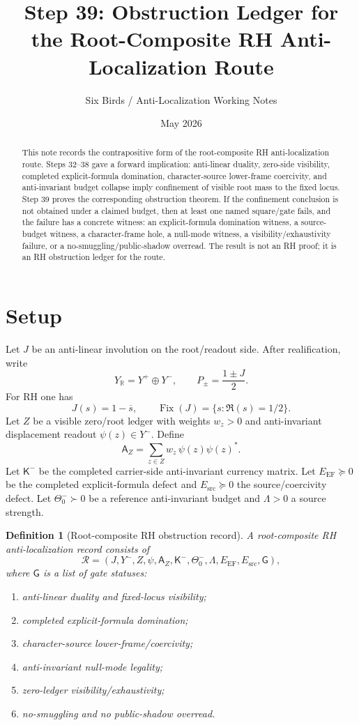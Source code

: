 \documentclass[11pt]{article}
\title{Step 39: Obstruction Ledger for the Root-Composite RH Anti-Localization Route}
\author{Six Birds / Anti-Localization Working Notes}
\date{May 2026}
\newtheorem{definition}{Definition}
\newcommand{\K}{\mathsf K}
\newcommand{\A}{\mathsf A}
\newcommand{\EF}{\mathrm{EF}}
\newcommand{\src}{\mathrm{src}}
\newcommand{\Fix}{\operatorname{Fix}}
\begin{document}
\maketitle

\begin{abstract}
This note records the contrapositive form of the root-composite RH anti-localization route.  Steps 32--38 gave a forward implication: anti-linear duality, zero-side visibility, completed explicit-formula domination, character-source lower-frame coercivity, and anti-invariant budget collapse imply confinement of visible root mass to the fixed locus.  Step 39 proves the corresponding obstruction theorem.  If the confinement conclusion is not obtained under a claimed budget, then at least one named square/gate fails, and the failure has a concrete witness: an explicit-formula domination witness, a source-budget witness, a character-frame hole, a null-mode witness, a visibility/exhaustivity failure, or a no-smuggling/public-shadow overread.  The result is not an RH proof; it is an RH obstruction ledger for the route.
\end{abstract}

\section{Setup}

Let $J$ be an anti-linear involution on the root/readout side.  After realification, write
\[
Y_{\mathbb R}=Y^+\oplus Y^-,
\qquad
P_\pm=\frac{1\pm J}{2}.
\]
For RH one has
\[
J(s)=1-\overline{s},
\qquad
\Fix(J)=\{s:\Re(s)=1/2\}.
\]
Let $Z$ be a visible zero/root ledger with weights $w_z>0$ and anti-invariant displacement readout $\psi(z)\in Y^-$.  Define
\[
\A_Z=\sum_{z\in Z}w_z\,\psi(z)\psi(z)^*.
\]
Let $\K^-$ be the completed carrier-side anti-invariant currency matrix.  Let $E_{\EF}\succeq0$ be the completed explicit-formula defect and $E_{\src}\succeq0$ the source/coercivity defect.  Let $\Theta_0^-\succ0$ be a reference anti-invariant budget and $\Lambda>0$ a source strength.

\begin{definition}[Root-composite RH obstruction record]
A root-composite RH anti-localization record consists of
\[
\mathcal R=(J,Y^-,Z,\psi,\A_Z,\K^-,\Theta_0^-,\Lambda,E_{\EF},E_{\src},\mathsf G),
\]
where $\mathsf G$ is a list of gate statuses:
\begin{enumerate}[label=G\arabic*.,leftmargin=2.5em]
\item anti-linear duality and fixed-locus visibility;
\item completed explicit-formula domination;
\item character-source lower-frame/coercivity;
\item anti-invariant null-mode legality;
\item zero-ledger visibility/exhaustivity;
\item no-smuggling and no public-shadow overread.
\end{enumerate}
\end{definition}
\end{document}
